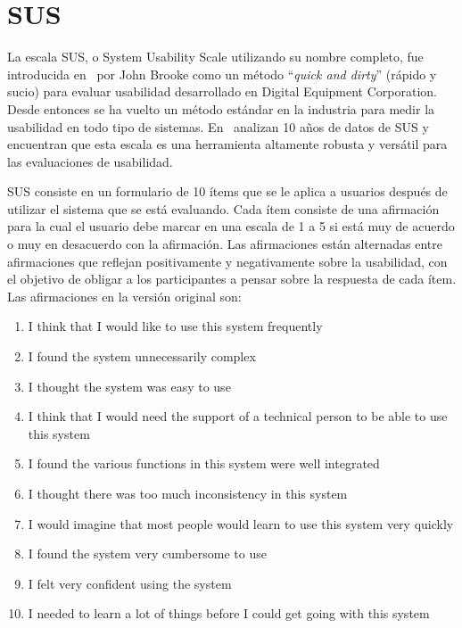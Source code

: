 \section{SUS}
\label{state-of-the-art:sus}

La escala SUS, o System Usability Scale utilizando su nombre completo, fue introducida en~\cite{brooke1996quick} por John Brooke como un método ``\textit{quick and dirty}'' (rápido y sucio) para evaluar usabilidad desarrollado en Digital Equipment Corporation. Desde entonces se ha vuelto un método estándar en la industria para medir la usabilidad en todo tipo de sistemas. En~\cite{evaluation-of-sus} analizan 10 años de datos de SUS y encuentran que esta escala es una herramienta altamente robusta y versátil para las evaluaciones de usabilidad.

SUS consiste en un formulario de 10 ítems que se le aplica a usuarios después de utilizar el sistema que se está evaluando. Cada ítem consiste de una afirmación para la cual el usuario debe marcar en una escala de 1 a 5 si está muy de acuerdo o muy en desacuerdo con la afirmación. Las afirmaciones están alternadas entre afirmaciones que reflejan positivamente y negativamente sobre la usabilidad, con el objetivo de obligar a los participantes a pensar sobre la respuesta de cada ítem. Las afirmaciones en la versión original son:
\begin{enumerate}
    \item I think that I would like to use this system frequently
    \item I found the system unnecessarily complex
    \item I thought the system was easy to use
    \item I think that I would need the support of a technical person to be able to use this system
    \item I found the various functions in this system were well integrated
    \item I thought there was too much inconsistency in this system
    \item I would imagine that most people would learn to use this system very quickly
    \item I found the system very cumbersome to use
    \item I felt very confident using the system
    \item I needed to learn a lot of things before I could get going with this system
\end{enumerate}


